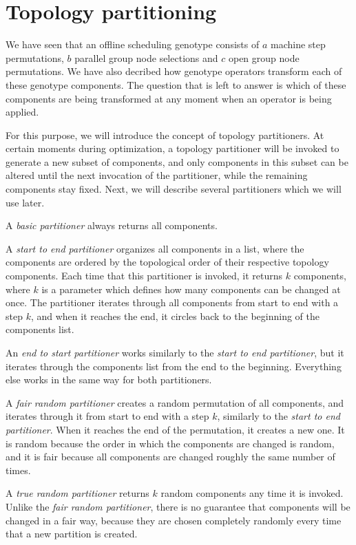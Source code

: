 \section{Topology partitioning}
\label{sec:topology_partitioning}

We have seen that an offline scheduling genotype consists of $a$ machine step permutations, $b$ parallel group node selections and $c$ open group node permutations. We have also decribed how genotype operators transform each of these genotype components. The question that is left to answer is which of these components are being transformed at any moment when an operator is being applied.

For this purpose, we will introduce the concept of topology partitioners. At certain moments during optimization, a topology partitioner will be invoked to generate a new subset of components, and only components in this subset can be altered until the next invocation of the partitioner, while the remaining components stay fixed. Next, we will describe several partitioners which we will use later.

A \textit{basic partitioner} always returns all components.

A \textit{start to end partitioner} organizes all components in a list, where the components are ordered by the topological order of their respective topology components. Each time that this partitioner is invoked, it returns $k$ components, where $k$ is a parameter which defines how many components can be changed at once. The partitioner iterates through all components from start to end with a step $k$, and when it reaches the end, it circles back to the beginning of the components list.

An \textit{end to start partitioner} works similarly to the \textit{start to end partitioner}, but it iterates through the components list from the end to the beginning. Everything else works in the same way for both partitioners.

A \textit{fair random partitioner} creates a random permutation of all components, and iterates through it from start to end with a step $k$, similarly to the \textit{start to end partitioner}. When it reaches the end of the permutation, it creates a new one. It is random because the order in which the components are changed is random, and it is fair because all components are changed roughly the same number of times.

A \textit{true random partitioner} returns $k$ random components any time it is invoked. Unlike the \textit{fair random partitioner}, there is no guarantee that components will be changed in a fair way, because they are chosen completely randomly every time that a new partition is created.

